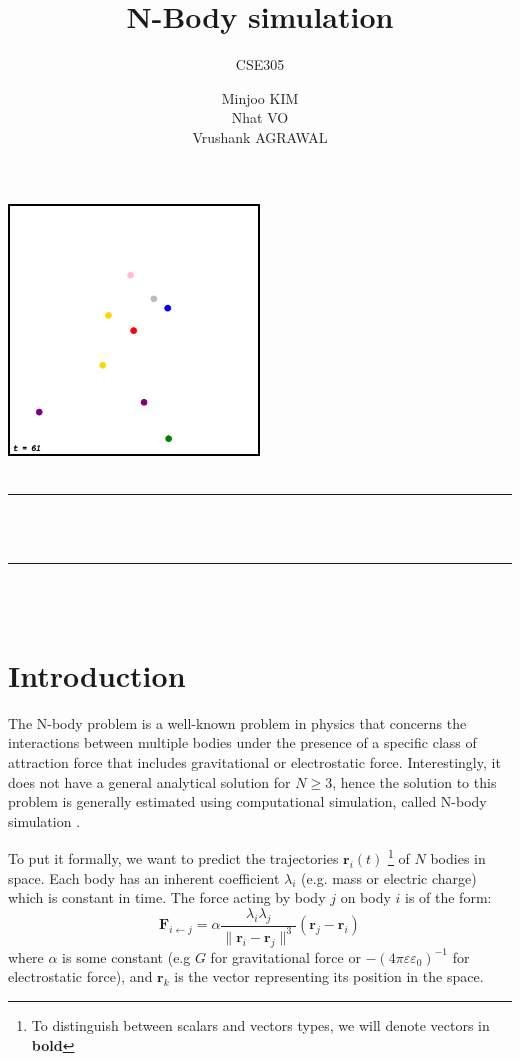 \documentclass[12pt]{article}
\title{N-Body simulation}
\author{CSE305}
\date{
    Minjoo KIM \\ 
    Nhat VO \\
    Vrushank AGRAWAL
}
\makeatletter
\let\thetitle\@title
\let\theauthor\@author
\let\thedate\@date
\makeatother
\begin{document}
\begin{titlepage}
	\centering
    \vspace*{0.5 cm}
    \includegraphics[width = 0.5\textwidth]{images/n-body.png}\\[1.0 cm]	%
	\textsc{\Large \theauthor}\\[0.5 cm]				%
	\rule{\linewidth}{0.2 mm} \\[0.4 cm]
	{ \huge \bfseries \thetitle}\\                  
	\rule{\linewidth}{0.2 mm} \\[1.5 cm]
    \thedate\\
\end{titlepage}

\section{Introduction}
The N-body problem \cite{wiki:N-body_problem} is a well-known problem in physics that concerns the interactions between multiple bodies under the presence of a specific class of attraction force that includes gravitational or electrostatic force. 
Interestingly, it does not have a general analytical solution for $N \geq 3$, hence the solution to this problem is generally estimated using computational simulation, called N-body simulation \cite{wiki:N-body_simulation}.

To put it formally, we want to predict the trajectories $\boldsymbol{r}_i(t)$ \footnote{To distinguish between scalars and vectors types, we will denote vectors in \textbf{bold}} of $N$ bodies in space.
Each body has an inherent coefficient $\lambda_i$ (e.g. mass or electric charge) which is constant in time.
The force acting by body $j$ on body $i$ is of the form:
$$\boldsymbol{F}_{i \gets j} = \alpha \frac{\lambda_i \lambda_j}{\|\boldsymbol{r}_i - \boldsymbol{r}_j\|^3} (\boldsymbol{r}_j - \boldsymbol{r}_i)$$
where $\alpha$ is some constant (e.g $G$ for gravitational force or $-(4\pi\varepsilon\varepsilon_0)^{-1}$ for electrostatic force), and $\boldsymbol{r}_k$ is the vector representing its position in the space.
\end{document}
